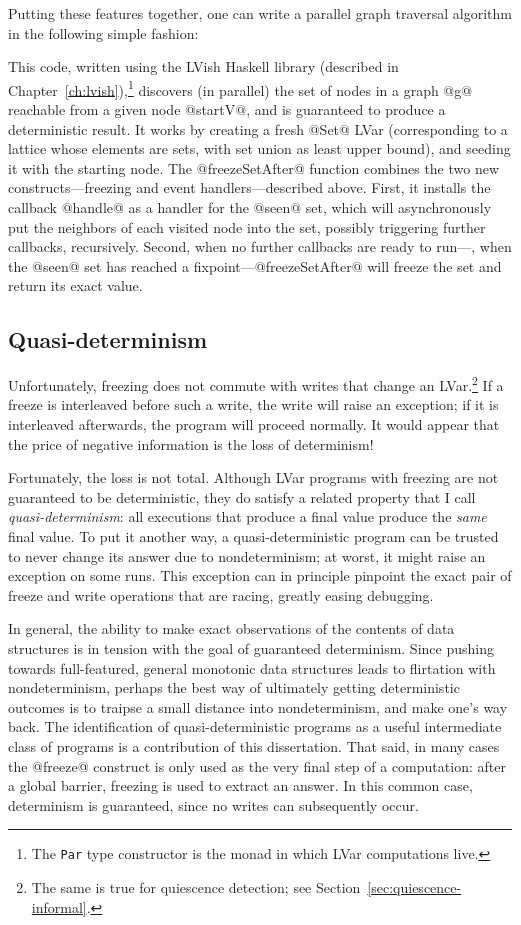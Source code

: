 Putting these features together, one can write a parallel graph
traversal algorithm in the following simple fashion:



This code, written using the LVish Haskell library (described in
Chapter~\ref{ch:lvish}),\footnote{The \texttt{Par} type constructor is
  the monad in which LVar computations live.}  discovers (in parallel)
the set of nodes in a graph @g@ reachable from a given node @startV@,
and is guaranteed to produce a deterministic result.  It works by
creating a fresh @Set@ LVar (corresponding to a lattice whose elements
are sets, with set union as least upper bound), and seeding it with
the starting node.  The @freezeSetAfter@ function combines the two new
constructs---freezing and event handlers---described above.  First, it
installs the callback @handle@ as a handler for the @seen@ set, which
will asynchronously put the neighbors of each visited node into the
set, possibly triggering further callbacks, recursively.  Second, when
no further callbacks are ready to run---\ie, when the @seen@ set has
reached a fixpoint---@freezeSetAfter@ will freeze the set and return
its exact value.

\subsection{Quasi-determinism}

Unfortunately, freezing does not commute with writes that change an
LVar.\footnote{The same is true for quiescence detection; see
  Section~\ref{sec:quiescence-informal}.}  If a freeze is interleaved
before such a write, the write will raise an exception; if it is
interleaved afterwards, the program will proceed normally.  It would
appear that the price of negative information is the loss of
determinism!

Fortunately, the loss is not total.  Although LVar programs with
freezing are not guaranteed to be deterministic, they do satisfy a
related property that I call \emph{quasi-determinism}: all executions
that produce a final value produce the \emph{same} final value.  To
put it another way, a quasi-deterministic program can be trusted to
never change its answer due to nondeterminism; at worst, it might
raise an exception on some runs.  This exception can in principle
pinpoint the exact pair of freeze and write operations that are
racing, greatly easing debugging.

In general, the ability to make exact observations of the contents of
data structures is in tension with the goal of guaranteed determinism.
Since pushing towards full-featured, general monotonic data structures
leads to flirtation with nondeterminism, perhaps the best way of
ultimately getting deterministic outcomes is to traipse a small
distance into nondeterminism, and make one's way back.  The
identification of quasi-deterministic programs as a useful
intermediate class of programs is a contribution of this dissertation.
That said, in many cases the @freeze@ construct is only used as the
very final step of a computation: after a global barrier, freezing is
used to extract an answer.  In this common case, determinism is
guaranteed, since no writes can subsequently occur.

